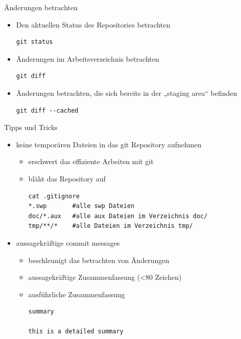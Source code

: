 \begin{frame}[fragile]{Änderungen betrachten}
  \begin{itemize}
    \item Den aktuellen Status des Repositories betrachten
    \begin{lstlisting}
git status
    \end{lstlisting}
    \item Änderungen im Arbeitsverzeichnis betrachten
    \begin{lstlisting}
git diff
    \end{lstlisting}
    \item Änderungen betrachten, die sich bereits in der „staging area“ befinden
    \begin{lstlisting}
git diff --cached
    \end{lstlisting}
  \end{itemize}
\end{frame}

\begin{frame}[fragile]{Tipps und Tricks}
  \begin{itemize}
    \item keine temporären Dateien in das git Repository aufnehmen
    \begin{itemize}
      \item erschwert das effiziente Arbeiten mit git
      \item bläht das Repository auf
    \begin{lstlisting}
cat .gitignore
*.swp       #alle swp Dateien
doc/*.aux   #alle aux Dateien im Verzeichnis doc/
tmp/**/*    #alle Dateien im Verzeichnis tmp/
    \end{lstlisting}
    \end{itemize}
    \item aussagekräftige commit messages
    \begin{itemize}
      \item beschleunigt das betrachten von Änderungen
      \item aussagekräftige Zusammenfassung (<80 Zeichen)
      \item ausführliche Zusammenfassung
    \begin{lstlisting}
summary

this is a detailed summary 
    \end{lstlisting}
    \end{itemize}
  \end{itemize}
\end{frame}

